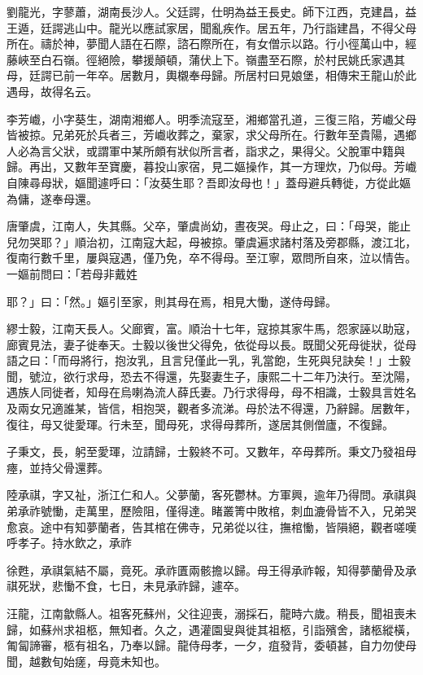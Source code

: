 \begin{pinyinscope}
劉龍光，字蓼蕭，湖南長沙人。父廷諤，仕明為益王長史。師下江西，克建昌，益王遁，廷諤逃山中。龍光以應試家居，聞亂疾作。居五年，乃行詣建昌，不得父母所在。禱於神，夢聞人語在石際，諮石際所在，有女僧示以路。行小徑萬山中，經藤峽至白石嶺。徑絕險，攀援顛頓，蒲伏上下。嶺盡至石際，於村民姚氏家遇其母，廷諤已前一年卒。居數月，輿櫬奉母歸。所居村曰見娘堡，相傳宋王龍山於此遇母，故得名云。

李芳巇，小字葵生，湖南湘鄉人。明季流寇至，湘鄉當孔道，三復三陷，芳巇父母皆被掠。兄弟死於兵者三，芳巇收葬之，棄家，求父母所在。行數年至貴陽，遇鄉人必為言父狀，或謂軍中某所頗有狀似所言者，詣求之，果得父。父脫軍中籍與歸。再出，又數年至寶慶，暮投山家宿，見二嫗操作，其一方理炊，乃似母。芳巇自陳尋母狀，嫗聞遽呼曰：「汝葵生耶？吾即汝母也！」蓋母避兵轉徙，方從此嫗為傭，遂奉母還。

唐肇虞，江南人，失其縣。父卒，肇虞尚幼，晝夜哭。母止之，曰：「母哭，能止兒勿哭耶？」順治初，江南寇大起，母被掠。肇虞遍求諸村落及旁郡縣，渡江北，復南行數千里，屢與寇遇，僅乃免，卒不得母。至江寧，眾問所自來，泣以情告。一嫗前問曰：「若母非戴姓

耶？」曰：「然。」嫗引至家，則其母在焉，相見大慟，遂侍母歸。

繆士毅，江南天長人。父廊賓，富。順治十七年，寇掠其家牛馬，怨家誣以助寇，廊賓見法，妻子徙奉天。士毅以後世父得免，依從母以長。既聞父死母徙狀，從母語之曰：「而母將行，抱汝乳，且言兒僅此一乳，乳當飽，生死與兒訣矣！」士毅聞，號泣，欲行求母，恐去不得還，先娶妻生子，康熙二十二年乃決行。至沈陽，遇族人同徙者，知母在烏喇為流人薛氏妻。乃行求得母，母不相識，士毅具言姓名及兩女兄適誰某，皆信，相抱哭，觀者多流涕。母於法不得還，乃辭歸。居數年，復往，母又徙愛琿。行未至，聞母死，求得母葬所，遂居其側僧廬，不復歸。

子秉文，長，躬至愛琿，泣請歸，士毅終不可。又數年，卒母葬所。秉文乃發祖母瘞，並持父骨還葬。

陸承祺，字又祉，浙江仁和人。父夢蘭，客死鬱林。方軍興，逾年乃得問。承祺與弟承祚號慟，走萬里，歷險阻，僅得達。睹叢箐中敗棺，刺血漉骨皆不入，兄弟哭愈哀。途中有知夢蘭者，告其棺在佛寺，兄弟從以往，撫棺慟，皆隕絕，觀者嗟嘆呼孝子。持水飲之，承祚

徐甦，承祺氣結不屬，竟死。承祚匱兩骸擔以歸。母王得承祚報，知得夢蘭骨及承祺死狀，悲慟不食，七日，未見承祚歸，遽卒。

汪龍，江南歙縣人。祖客死蘇州，父往迎喪，溺採石，龍時六歲。稍長，聞祖喪未歸，如蘇州求祖柩，無知者。久之，遇灌園叟與徙其祖柩，引詣殯舍，諸柩縱橫，匍匐諦審，柩有祖名，乃奉以歸。龍侍母孝，一夕，疽發背，委頓甚，自力勿使母聞，越數旬始瘥，母竟未知也。


\end{pinyinscope}
